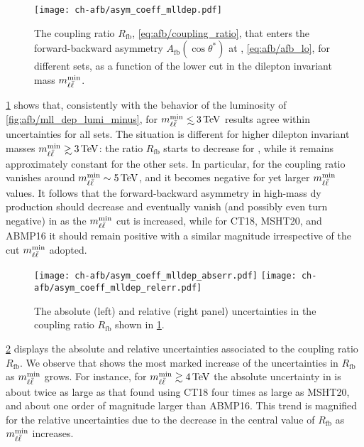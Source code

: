 \begin{figure}[!t]
 \centering
 \texttt{[image: ch-afb/asym\_coeff\_mlldep.pdf]}
 \caption{
   The coupling ratio $R_{\text{fb}}$, \cref{eq:afb/coupling_ratio}, that
   enters the forward-backward asymmetry $A_{\text{fb}}(\cos\theta^*)$ at \lo, 
   \cref{eq:afb/afb_lo}, for different \pdf sets, as  a function of the lower
   cut in the dilepton invariant mass $m_{\ell\bar{\ell}}^{\text{min}}$.
 }    
 \label{fig:afb/asym_coeff_mlldep}
\end{figure}

\cref{fig:afb/asym_coeff_mlldep} shows that, consistently with the behavior of
the luminosity of \cref{fig:afb/mll_dep_lumi_minus},  for
$\mll^{\text{min}}\lsim \SI{3}{\tera\electronvolt}$ results agree within
uncertainties for all \pdf sets.
%
The situation is different for higher dilepton invariant masses $\mll^{{\text{min}}}\gsim \SI{3}{\tera\electronvolt}$:
the ratio $R_{\text{fb}}$ starts to decrease for , while it
remains approximately  constant 
for the other  \pdf sets. In particular, for  the coupling ratio
vanishes around $\mll^{{\text{min}}}\sim\SI{5}{\tera\electronvolt}$, and it becomes negative
for yet larger   $m_{\ell\bar{\ell}}^{{\text{min}}}$ values.
It follows that the forward-backward
asymmetry in high-mass \acrlong{dy} production should decrease  and
eventually vanish (and possibly even turn negative)
in  as the $m_{\ell\bar{\ell}}^{{\text{min}}}$ cut is increased,
while for CT18, MSHT20, and ABMP16 it should remain positive
with a similar magnitude irrespective of the cut  $m_{\ell\bar{\ell}}^{{\text{min}}}$ adopted.

\begin{figure}[!t]
 \centering
 \texttt{[image: ch-afb/asym\_coeff\_mlldep\_abserr.pdf]}
 \texttt{[image: ch-afb/asym\_coeff\_mlldep\_relerr.pdf]}
 \caption{The absolute (left) and relative (right panel) uncertainties
   in the coupling ratio $R_{\text{fb}}$ shown in \cref{fig:afb/asym_coeff_mlldep}.
 }    
 \label{fig:afb/asym_coeff_mlldep_err}
\end{figure}

\cref{fig:afb/asym_coeff_mlldep_err} displays the 
absolute  and relative  uncertainties
associated to the coupling ratio $R_{\text{fb}}$.
%
We observe that  shows
the most marked increase of the uncertainties in $R_{\text{fb}}$
as $m_{\ell\bar{\ell}}^{\text{min}}$ grows.
%
For instance, for  $\mll^{\text{min}}\gtrsim\SI{4}{\tera\electronvolt}$
the absolute \pdf uncertainty in 
is about twice as large as that found using CT18 
four times as large as MSHT20,
and about one order of magnitude larger than ABMP16.
%
This trend is magnified for the relative uncertainties
due to the decrease in the central value of $R_{\text{fb}}$
as $m_{\ell\bar{\ell}}^{\text{min}}$ increases.
